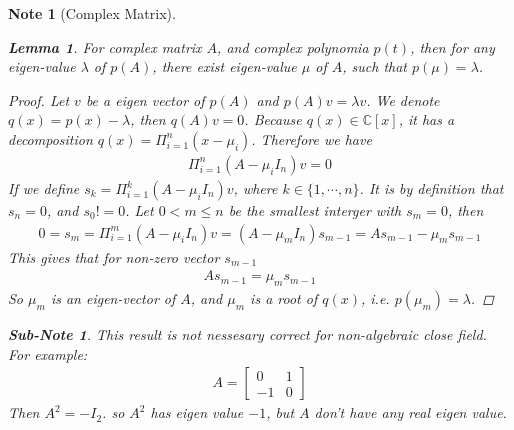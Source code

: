 \documentclass[pdf]{article}
\newtheorem{lemma}[theorem]{Lemma}
\newtheorem{note}[theorem]{Note}
\newtheorem{subnote}[corollary]{Sub-Note}
\begin{document}
\begin{note}[Complex Matrix]\label{Eigen-Value}
\begin{lemma}
For complex matrix $A$, and complex polynomia $p(t)$, then for any eigen-value $\lambda$ of $p(A)$, there exist eigen-value $\mu$ of $A$, such that $p(\mu) = \lambda$.
\end{lemma}
\begin{proof}
	Let $v$ be a eigen vector of $p(A)$ and $p(A)v = \lambda v$. We denote $q(x) = p(x) - \lambda$, then $q(A)v = 0$. Because $q(x) \in \mathbb{C}[x]$, it has a decomposition $q(x) = \Pi_{i=1}^n(x-\mu_i)$. Therefore we have
		\begin{align*}
		\Pi_{i=1}^n(A-\mu_i I_n)v = 0
		\end{align*}
	If we define $s_k = \Pi_{i=1}^k(A-\mu_i I_n)v$, where $k\in\{1, \cdots, n\}$. It is by definition that $s_n = 0$, and $s_0 != 0$. Let $0<m\leq n$ be the smallest interger with $s_m = 0$, then 
		\begin{align*}
		0= s_m = \Pi_{i=1}^m(A-\mu_i I_n)v = (A-\mu_m I_n)s_{m-1} = As_{m-1} - \mu_ms_{m-1}
		\end{align*}
	This gives that for non-zero vector $s_{m-1}$
		\begin{align*}
		As_{m-1} = \mu_ms_{m-1}
		\end{align*}
	So $\mu_m$ is an eigen-vector of $A$, and $\mu_m$ is a root of $q(x)$, i.e. $p(\mu_m) = \lambda$.
\end{proof}

\begin{subnote}
This result is not nessesary correct for non-algebraic close field. For example:
\begin{align*}
A = \begin{bmatrix}
0 & 1\\
-1 & 0
\end{bmatrix}
\end{align*}
Then $A^2 = -I_2$. so $A^2$ has eigen value $-1$, but $A$ don't have any real eigen value.
\end{subnote}

\end{note}
\end{document}
